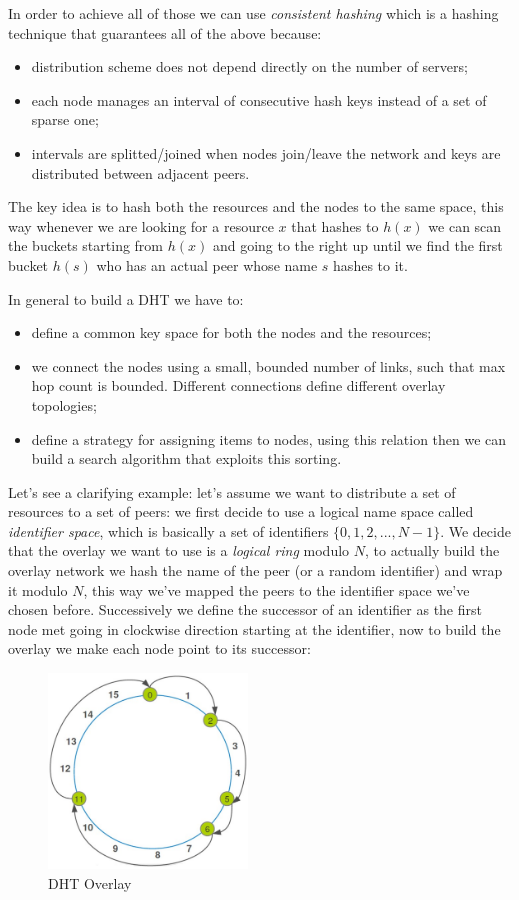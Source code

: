 In order to achieve all of those we can use \emph{consistent hashing} which is a hashing technique that guarantees all of the above because:
\begin{itemize}
    \item distribution scheme does not depend directly on the number of servers;
    \item each node manages an interval of consecutive hash keys instead of a set of sparse one;
    \item intervals are splitted/joined when nodes join/leave the network and keys are distributed between adjacent peers. 
\end{itemize}

The key idea is to hash both the resources and the nodes to the same space, this way whenever we are looking for a resource $x$ that hashes to $h(x)$ we can scan the buckets starting from $h(x)$ and going to the right up until we find the first bucket $h(s)$ who has an actual peer whose name $s$ hashes to it. 

In general to build a DHT we have to:
\begin{itemize}
    \item define a common key space for both the nodes and the resources;

    \item we connect the nodes using a small, bounded number of links, such that max hop count is bounded.
    Different connections define different overlay topologies;

    \item define a strategy for assigning items to nodes, using this relation then we can build a search algorithm that exploits this sorting.
\end{itemize}

Let's see a clarifying example: let's assume we want to distribute a set of resources to a set of peers: we first decide to use a logical name space called \emph{identifier space}, which is basically a set of identifiers $\{0, 1, 2, ..., N-1\}$.
We decide that the overlay we want to use is a \emph{logical ring} modulo $N$, to actually build the overlay network we hash the name of the peer (or a random identifier) and wrap it modulo $N$, this way we've mapped the peers to the identifier space we've chosen before.
Successively we define the successor of an identifier as the first node met going in clockwise direction starting at the identifier, now to build the overlay we make each node point to its successor:
\begin{figure}[H]
    \centering
    \includegraphics[width=200px]{images/3_DHT/01.png}
    \caption{DHT Overlay}
\end{figure}

